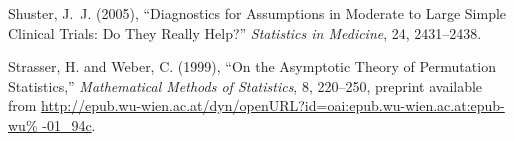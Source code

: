 \documentclass{article}
\begin{document}
\begin{thebibliography}{22}
Shuster, J.~J. (2005), \enquote{Diagnostics for Assumptions in Moderate to
  Large Simple Clinical Trials: {D}o They Really Help?} \textit{Statistics in
  Medicine}, 24, 2431--2438.

Strasser, H. and Weber, C. (1999), \enquote{On the Asymptotic Theory of
  Permutation Statistics,} \textit{Mathematical Methods of Statistics}, 8,
  220--250, preprint available from
  \url{http://epub.wu-wien.ac.at/dyn/openURL?id=oai:epub.wu-wien.ac.at:epub-wu%
-01_94c}.

\end{thebibliography}
\end{document}
